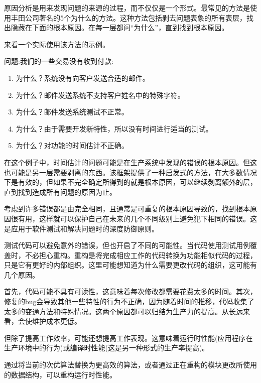 原因分析是用来发现问题的来源的过程，而不仅仅是一个形式。最常见的方法是使用丰田公司著名的5个为什么的方法。这种方法包括剥去问题表象的所有表层，找出隐藏在下面的根本原因。在每一层都问“为什么”，直到找到根本原因。

来看一个实际使用该方法的示例。

问题:我们的一些交易没有收到付款:

\begin{enumerate}
\item 
为什么？系统没有向客户发送合适的邮件。

\item 
为什么？邮件发送系统不支持客户姓名中的特殊字符。

\item 
为什么？邮件发送系统测试不正常。

\item 
为什么？由于需要开发新特性，所以没有时间进行适当的测试。

\item 
为什么？对功能的时间估计不正确。
\end{enumerate}

在这个例子中，时间估计的问题可能是在生产系统中发现的错误的根本原因。但这也可能是另一层需要剥离的东西。该框架提供了一种启发式的方法，在大多数情况下是有效的，但如果不完全确定所得到的就是根本原因，可以继续剥离额外的层，直到找到造成所有问题的原因为止。

考虑到许多错误都是由完全相同，且通常是可重复的根本原因导致的，找到根本原因很有用，这样就可以保护自己在未来的几个不同级别上避免犯下相同的错误。这是应用于软件测试和解决问题时的深度防御原则。


测试代码可以避免意外的错误，但也开启了不同的可能性。当代码使用测试用例覆盖时，不必担心重构。重构是将完成相应工作的代码转换为功能相似代码的过程，只是它有更好的内部组织。这里可能想知道为什么需要更改代码的组织，这可能有几个原因。

首先，代码可能不具有可读性，这意味着每次修改都需要花费太多的时间。其次，修复的bug会导致其他一些特性的行为不正确，因为随着时间的推移，代码收集了太多的变通方法和特殊情况。这两个原因都可以归结为生产力的提高。从长远来看，会使维护成本更低。

但除了提高工作效率，可能还想提高工作表现。这意味着运行时性能(应用程序在生产环境中的行为)或编译时性能(这是另一种形式的生产率提高)。

通过将当前的次优算法替换为更高效的算法，或者通过正在重构的模块更改所使用的数据结构，可以重构运行时性能。

